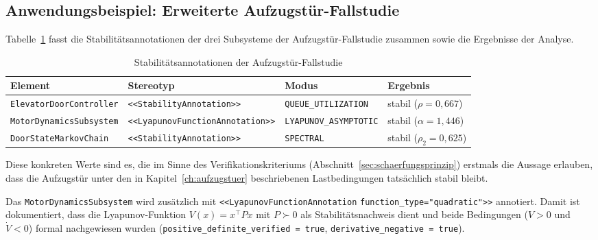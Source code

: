 ﻿\documentclass[a4paper,12pt]{report}
\theoremstyle{definition}
\begin{document}
\subsection{Anwendungsbeispiel: Erweiterte Aufzugstür-Fallstudie}

Tabelle~\ref{tab:elevator-stability} fasst die Stabilitätsannotationen der
drei Subsysteme der Aufzugstür-Fallstudie zusammen sowie die Ergebnisse der
Analyse.

\begin{table}
	\centering
	\begin{tabular}{@{}llll@{}}
		\toprule
		\textbf{Element} & \textbf{Stereotyp} & \textbf{Modus}
		& \textbf{Ergebnis} \\
		\midrule
		\texttt{ElevatorDoor}\newline\texttt{Controller}
		& \texttt{<<Stability}\newline\texttt{Annotation>>}
		& \texttt{QUEUE\_}\newline\texttt{UTILIZATION}
		& stabil ($\rho = 0{,}667$) \\[6pt]
		\texttt{MotorDynamics}\newline\texttt{Subsystem}
		& \texttt{<<Lyapunov}\newline\texttt{FunctionAnnotation>>}
		& \texttt{LYAPUNOV\_}\newline\texttt{ASYMPTOTIC}
		& stabil ($\alpha = 1{,}446$) \\[6pt]
		\texttt{DoorState}\newline\texttt{MarkovChain}
		& \texttt{<<Stability}\newline\texttt{Annotation>>}
		& \texttt{SPECTRAL}
		& stabil ($\rho_2 = 0{,}625$) \\
		\bottomrule
	\end{tabular}
	\caption{Stabilitätsannotationen der Aufzugstür-Fallstudie}
\label{tab:eq-vs-stab}
	\label{tab:elevator-stability}
\end{table}

Diese konkreten Werte sind es, die im Sinne des Verifikationskriteriums (Abschnitt~\ref{sec:schaerfungsprinzip}) erstmals die Aussage erlauben, dass die Aufzugstür unter den in Kapitel~\ref{ch:aufzugstuer} beschriebenen Lastbedingungen tatsächlich stabil bleibt.

Das \texttt{MotorDynamicsSubsystem} wird zusätzlich mit
\texttt{<<LyapunovFunctionAnno\newline tation} \texttt{function\_type="quadratic">>}
annotiert. Damit ist dokumentiert, dass die Lyapunov-Funktion
$V(x) = x^\top P x$ mit $P \succ 0$ als Stabilitätsnachweis dient und
beide Bedingungen ($V > 0$ und $\dot{V} < 0$) formal nachgewiesen wurden
(\texttt{positive\_definite\_veri\newline fied = true},
\texttt{derivative\_negative = true}).
\end{document}
